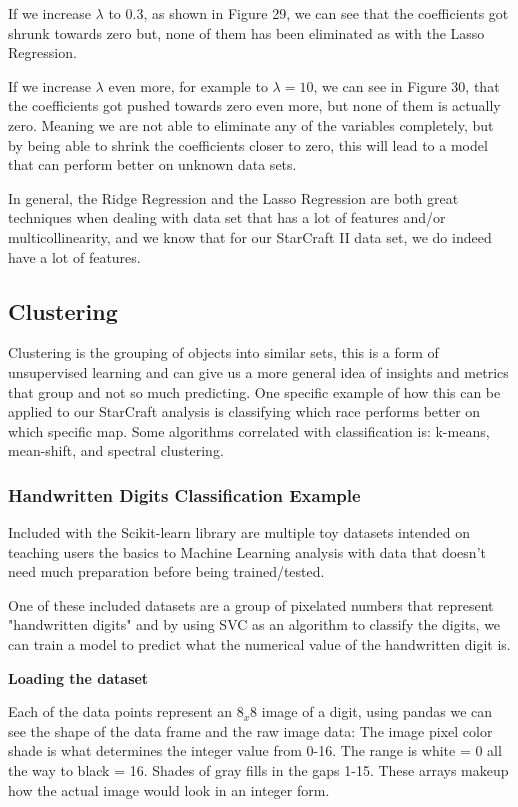 \documentclass[a4paper,12pt]{report}
\newcommand{\msection}[1]{\noindent\textbf{#1}}
\begin{document}
If we increase $\lambda$ to 0.3, as shown in Figure 29, we can see that the coefficients got shrunk towards zero but, none of them has been eliminated as with the Lasso Regression. 

If we increase $\lambda$ even more, for example to $\lambda=10$, we can see in Figure 30, that the coefficients got pushed towards zero even more, but none of them is actually zero. Meaning we are not able to eliminate any of the variables completely, but by being able to shrink the coefficients closer to zero, this will lead to a model that can perform better on unknown data sets. 

In general, the Ridge Regression and the Lasso Regression are both great techniques when dealing with data set that has a lot of features and/or multicollinearity, and we know that for our StarCraft II data set, we do indeed have a lot of features.

\subsection{Clustering}
Clustering is the grouping of objects into similar sets, this is a form of unsupervised learning and can give us a more general idea of insights and metrics that group and not so much predicting. One specific example of how this can be applied to our StarCraft analysis is classifying which race performs better on which specific map. Some algorithms correlated with classification is: k-means, mean-shift, and spectral clustering.

\subsubsection{Handwritten Digits Classification Example}

Included with the Scikit-learn library are multiple toy datasets intended on teaching users the basics to Machine Learning analysis with data that doesn’t need much preparation before being trained/tested.

One of these included datasets are a group of pixelated numbers that represent "handwritten digits" and by using SVC as an algorithm to classify the digits, we can train a model to predict what the numerical value of the handwritten digit is.

\msection{Loading the dataset}

Each of the data points represent an $8_x8$ image of a digit, using pandas we can see the shape of the data frame and the raw image data:
The image pixel color shade is what determines the integer value from 0-16. The range is white = 0 all the way to black = 16. Shades of gray fills in the gaps 1-15. These arrays makeup how the actual image would look in an integer form.	
\end{document}
